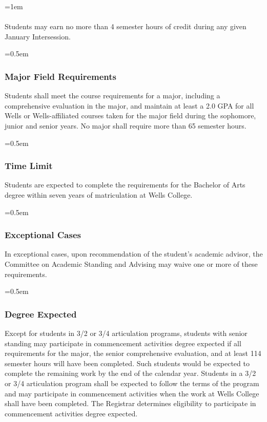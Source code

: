 \documentclass{manual}
\let\oldsubsubsection\subsubsection
\renewcommand\subsubsection{\leftskip=0.5em\oldsubsubsection}
\let\oldparagraph\paragraph
\renewcommand\paragraph{\leftskip=1em\oldparagraph}
\begin{document}
\paragraph{} Students may earn no more than 4 semester hours of credit during any given January  Intersession.





\subsubsection{Major Field Requirements}

Students  shall meet the course requirements for a major, including a comprehensive evaluation in the major, and maintain at least a 2.0 GPA for all Wells or Wells-affiliated courses taken for the major field during the sophomore, junior and senior years. No major shall require more than 65 semester hours.


\subsubsection{Time Limit}

Students are expected to complete the requirements for the Bachelor of Arts degree within seven years of matriculation at Wells College. 


\subsubsection{Exceptional Cases}

In exceptional cases, upon recommendation of the student's academic advisor, the Committee on Academic Standing and Advising may waive one or more of these requirements.


\subsubsection{Degree Expected}

 Except  for students in 3/2 or 3/4 articulation programs, students with senior standing may participate in commencement activities degree expected if all requirements for the major, the senior comprehensive evaluation, and at least 114 semester hours will have been completed. Such students would be expected to complete the remaining work by the end of the calendar year. Students in a 3/2 or 3/4 articulation program shall be expected to follow the terms of the program and may participate in commencement activities when the work at Wells College shall have been completed. The Registrar determines eligibility to participate in commencement activities degree expected.
\end{document}
